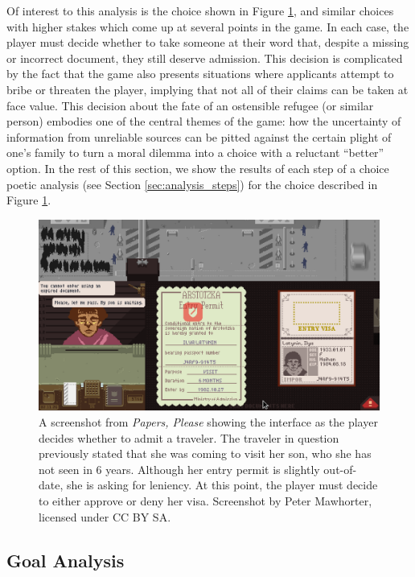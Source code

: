 \documentclass[arts,article,accept,moreauthors,pdftex,10pt,a4paper]{Definitions/mdpi}
\begin{document}
Of interest to this analysis is the choice shown in Figure \ref{fig:PP_visa}, and similar choices with higher stakes which come up at several points in the game.
%
In each case, the player must decide whether to take someone at their word that, despite a missing or incorrect document, they still deserve admission.
%
This decision is complicated by the fact that the game also presents situations where applicants attempt to bribe or threaten the player, implying that not all of their claims can be taken at face value.
%
This decision about the fate of an ostensible refugee (or similar person) embodies one of the central themes of the game: how the uncertainty of information from unreliable sources can be pitted against the certain plight of one's family to turn a moral dilemma into a choice with a reluctant ``better'' option.
%
In the rest of this section, we show the results of each step of a choice poetic analysis (see Section \ref{sec:analysis_steps}) for the choice described in Figure \ref{fig:PP_visa}.


\begin{figure}[H]
  \includegraphics[width=\textwidth]{fig/please-son-waiting.png}
  \caption{A screenshot from \emph{Papers, Please} showing the interface as the player decides whether to admit a traveler. The traveler in question previously stated that she was coming to visit her son, who she has not seen in 6 years. Although her entry permit is slightly out-of-date, she is asking for leniency. At this point, the player must decide to either approve or deny her visa. Screenshot by Peter Mawhorter, licensed under CC BY SA.}
  \label{fig:PP_visa}
\end{figure}


\subsection{Goal Analysis}
\end{document}
